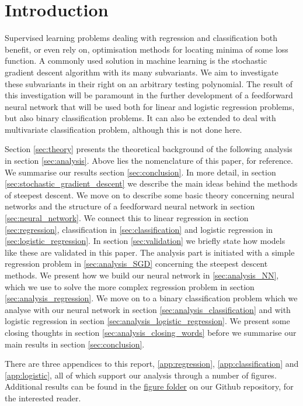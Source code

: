 \section{Introduction}\label{sec:introduction}


Supervised learning problems dealing with regression and classification both benefit, or even rely on, optimisation methods for locating minima of some loss function. A commonly used solution in machine learning is the stochastic gradient descent algorithm with its many subvariants. We aim to investigate these subvariants in their right on an arbitrary testing polynomial. The result of this investigation will be paramount in the further development of a feedforward neural network that will be used both for linear and logistic regression problems, but also binary classification problems. It can also be extended to deal with multivariate classification problem, although this is not done here. 


Section \ref{sec:theory} presents the theoretical background of the following analysis in section \ref{sec:analysis}. Above lies the nomenclature of this paper, for reference. We summarise our results section \ref{sec:conclusion}. In more detail, in section \ref{sec:stochastic_gradient_descent} we describe the main ideas behind the methods of steepest descent. We move on to describe some basic theory concerning neural networks and the structure of a feedforward neural network in section \ref{sec:neural_network}. We connect this to linear regression in section \ref{sec:regression}, classification in \ref{sec:classification} and logistic regression in \ref{sec:logistic_regression}. In section \ref{sec:validation} we briefly state how models like these are validated in this paper. The analysis part is initiated with a simple regression problem in \ref{sec:analysis_SGD} concerning the steepest descent methods. We present how we build our neural network in \ref{sec:analysis_NN}, which we use to solve the more complex regression problem in section \ref{sec:analysis_regression}. We move on to a binary classification problem which we analyse with our neural network in section \ref{sec:analysis_classification} and with logistic regression in section \ref{sec:analysis_logistic_regression}. We present some closing thoughts in section \ref{sec:analysis_closing_words} before we summarise our main results in section \ref{sec:conclusion}.

There are three appendices to this report, \ref{app:regression}, \ref{app:classification} and \ref{app:logistic}, all of which support our analysis through a number of figures. Additional results can be found in the \href{\figureslink}{figure folder} on our Github repository, for the interested reader.